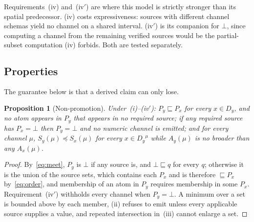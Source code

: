 \documentclass[preprint,3p,11pt,authoryear]{elsarticle}
\newtheorem{proposition}{Proposition}
\newcommand{\Dy}{\ensuremath{D_y}}
\begin{document}
Requirements~(iv) and~(iv$'$) are where this model is strictly stronger than
its spatial predecessor. (iv) costs expressiveness: sources with
different channel schemas yield no channel on a shared interval. (iv$'$) is
its companion for $\bot$, since computing a channel from the remaining
verified sources would be the partial-subset computation (iv) forbids. Both
are tested separately.

\subsection{Properties}
\label{sec:properties}

The guarantee below is that a derived claim can only lose.

\begin{proposition}[Non-promotion]
\label{prop:union}
Under~(i)--(iv$'$): $P_y \sqsubseteq P_x$ for every $x \in \Dy$, and no atom
appears in $P_y$ that appears in no required source; if any required source
has $P_x = \bot$ then $P_y = \bot$ and no numeric channel is emitted; and for
every channel $\mu$, $S_y(\mu) \preceq S_x(\mu)$ for every $x \in \Dy^{\mu}$
while $A_y(\mu)$ is no broader than any $A_x(\mu)$.
\end{proposition}
\begin{proof}
By~\eqref{eq:meet}, $P_y$ is $\bot$ if any source is, and $\bot \sqsubseteq q$
for every $q$; otherwise it is the union of the source sets, which contains
each $P_x$ and is therefore $\sqsubseteq P_x$ by~\eqref{eq:order}, and
membership of an atom in $P_y$ requires membership in some $P_x$.
Requirement~(iv$'$) withholds every channel when $P_y = \bot$. A minimum over
a set is bounded above by each member, (ii) refuses to emit unless every
applicable source supplies a value, and repeated intersection in~(iii) cannot
enlarge a set.
\end{proof}
\end{document}
